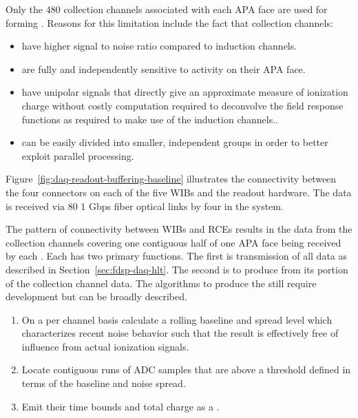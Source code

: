 Only the 480 collection channels associated with each APA face are
used for forming . 
Reasons for this limitation include the fact that collection
channels:

\begin{itemize}
\item have higher signal to noise ratio compared to induction channels.
\item are fully and independently sensitive to activity on their APA face.
\item have unipolar signals that directly give an approximate measure
  of ionization charge without costly computation required to
  deconvolve the field response functions as required to make use of
  the induction channels..
\item can be easily divided into smaller, independent groups in order
  to better exploit parallel processing.
\end{itemize}


Figure~\ref{fig:daq-readout-buffering-baseline} illustrates the connectivity between the
four connectors on each of the five WIBs and the  readout hardware.
The data is received via 80 1 Gbps fiber optical links by four 
in the   system. 

The pattern of connectivity between WIBs and RCEs results in the data
from the collection channels covering one contiguous half of one APA
face being received by each .
Each  has two primary functions. 
The first is transmission of all data as described in
Section~\ref{sec:fdsp-daq-hlt}. 
The second is to produce  from its portion of the
collection channel data.
The algorithms to produce the  still require
development but can be broadly described.   

\begin{enumerate}
\item On a per channel basis calculate a rolling baseline and spread
  level which characterizes recent noise behavior such that the result
  is effectively free of influence from actual ionization signals.
\item Locate contiguous runs of ADC samples that are above a threshold
  defined in terms of the baseline and noise spread.
\item Emit their time bounds and total charge as a .
\end{enumerate}

